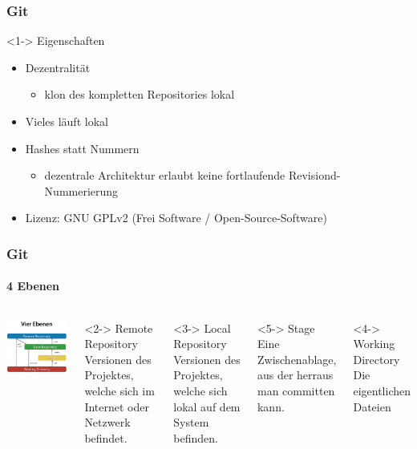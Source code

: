 \begin{frame}
	\frametitle{Git}
	\begin{block} <1-> {Eigenschaften}
		\begin{itemize}
			\item <1-> Dezentralität
			\begin{itemize}
				\item <1-> klon des kompletten Repositories lokal
			\end{itemize}
			\item <2-> Vieles läuft lokal
			\item <3-> Hashes statt Nummern
			\begin{itemize}
				\item <3-> dezentrale Architektur erlaubt keine fortlaufende Revisiond-Nummerierung
			\end{itemize}
			\item <4-> Lizenz: GNU GPLv2 (Frei Software / Open-Source-Software)
		\end{itemize}
	\end{block}
\end{frame}
\begin{frame}
	\frametitle{Git}
	\framesubtitle{4 Ebenen}
	\begin{columns}
			\includegraphics[scale=0.45]{./pictures/4_ebenen_git}
			\begin{block} <2-> {Remote Repository}
				Versionen des Projektes, welche sich im Internet oder Netzwerk befindet.
			\end{block}
			\begin{block} <3-> {Local Repository}
				Versionen des Projektes, welche sich lokal auf dem System befinden. 
			\end{block}
			\begin{block} <5-> {Stage}
				Eine Zwischenablage, aus der herraus man committen kann.
			\end{block}
			\begin{block} <4-> {Working Directory}
				Die eigentlichen Dateien
			\end{block}
	\end{columns}
\end{frame}